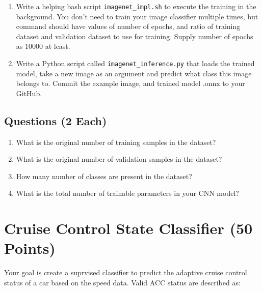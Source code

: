 \documentclass[12pt, xcolor=dvipsnames,svgnames,x11names]{article}
\begin{document}
\begin{enumerate}
\begin{enumerate}
\item You should be able to write your script in such a way that it should take command line argument such as number of epochs to train, ratio of training dataset and validation dataset to use for training. 

\item At the end of the training, a plot should be saved that should display loss and accuracy as a function of epochs. Commit the plot to the GitHub and provide the file in PDF submission.

\end{enumerate}

\item Write a helping bash script \texttt{imagenet_impl.sh} to execute the training in the background. You don't need to train your image classifier multiple times, but command should have values of number of epochs, and ratio of training dataset and validation dataset to use for training. Supply number of epochs as 10000 at least.

\item Write a Python script called \texttt{imagenet_inference.py} that loads the trained model, take a new image as an argument and predict what class this image belongs to.
Commit the example image, and trained model .onnx to your GitHub. 


\end{enumerate}



\subsection{Questions \hfill \textbf{(2 Each)}}


\begin{enumerate}
\item What is the original number of training samples in the dataset?
\item What is the original number of validation samples in the dataset?

\item How many number of classes are present in the dataset?

\item What is the total number of trainable parameters in your CNN model?

\end{enumerate}

\section{Cruise Control State Classifier \hfill \textbf{(50 Points)}}
Your goal is create a suprvised classifier to predict the adaptive cruise control status of a car based on the speed data. Valid ACC status are described as:
\end{document}
